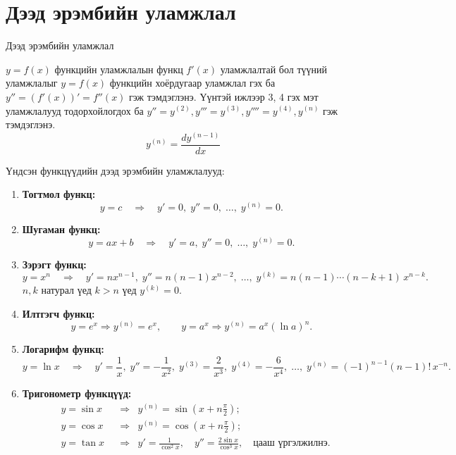 \section{Дээд эрэмбийн уламжлал}
\begin{frame}[allowframebreaks]{Дээд эрэмбийн уламжлал}
\begin{definition}
    $y=f(x)$ функцийн уламжлалын функц $f'(x)$ уламжлалтай бол түүний уламжлалыг $y=f(x)$ функцийн хоёрдугаар уламжлал гэх ба $y''=(f'(x))'=f''(x)$ гэж тэмдэглэнэ. Үүнтэй ижлээр 3, 4 гэх мэт уламжлалууд тодорхойлогдох ба $y''=y^{(2)}, y'''=y^{(3)}, y''''=y^{(4)}, y^{(n)}$ гэж тэмдэглэнэ. 
    $$y^{(n)}=\dfrac{d y^{(n-1)}}{dx}$$
\end{definition}
Үндсэн функцүүдийн дээд эрэмбийн уламжлалууд:

\begin{enumerate}
  \item \textbf{Тогтмол функц:} 
  \[
  y = c \quad \Rightarrow \quad y' = 0, \; y'' = 0, \; \ldots, \; y^{(n)} = 0.
  \]

  \item \textbf{Шугаман функц:} 
  \[
  y = ax + b \quad \Rightarrow \quad y' = a, \; y'' = 0, \; \ldots, \; y^{(n)} = 0.
  \]

  \item \textbf{Зэрэгт функц:} 
 \[
  y = x^n \quad \Rightarrow \quad 
  y' = n x^{n-1}, \;
  y'' = n(n-1) x^{n-2}, \;
  \ldots,\;
  y^{(k)} = n(n-1)\cdots (n-k+1)\, x^{n-k}.
  \] $n, k$ натурал үед 
  $k>n$ үед $y^{(k)}=0$.
  \item \textbf{Илтгэгч функц:} 
  \[
  y = e^{x} \Rightarrow y^{(n)} = e^{x}, 
  \qquad
  y = a^{x} \Rightarrow y^{(n)} = a^{x}(\ln a)^{n}.
  \]

  \item \textbf{Логарифм функц:} 
  \[
  y = \ln x \quad \Rightarrow \quad 
  y' = \frac{1}{x}, \;
  y'' = -\frac{1}{x^{2}}, \;
  y^{(3)} = \frac{2}{x^{3}}, \;
  y^{(4)} = -\frac{6}{x^{4}}, \;
  \ldots,\;
  y^{(n)} = (-1)^{n-1}(n-1)!\, x^{-n}.
  \]

  \item \textbf{Тригонометр функцүүд:}
  \[
  \begin{aligned}
  &y = \sin x 
    &&\Rightarrow&
    y^{(n)} = \sin\!\left(x + n\frac{\pi}{2}\right);\\[3pt]
  &y = \cos x 
    &&\Rightarrow&
    y^{(n)} = \cos\!\left(x + n\frac{\pi}{2}\right);\\[3pt]
  &y = \tan x 
    &&\Rightarrow&
    y' = \frac{1}{\cos^{2}x}, \quad
    y'' = \frac{2\sin x}{\cos^{3}x}, \quad \text{цааш үргэлжилнэ.}
  \end{aligned}
  \]


\end{enumerate}
\end{frame}
